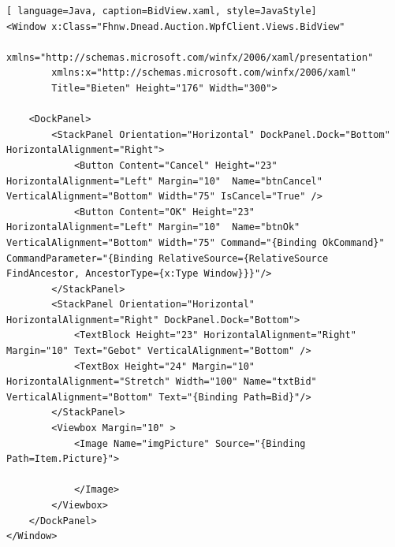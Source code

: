 \documentclass[10pt]{article}
\begin{document}
\begin{lstlisting}[ language=Java, caption=BidView.xaml, style=JavaStyle]
<Window x:Class="Fhnw.Dnead.Auction.WpfClient.Views.BidView"
        xmlns="http://schemas.microsoft.com/winfx/2006/xaml/presentation"
        xmlns:x="http://schemas.microsoft.com/winfx/2006/xaml"
        Title="Bieten" Height="176" Width="300">
   
    <DockPanel>
        <StackPanel Orientation="Horizontal" DockPanel.Dock="Bottom" HorizontalAlignment="Right">
            <Button Content="Cancel" Height="23" HorizontalAlignment="Left" Margin="10"  Name="btnCancel" VerticalAlignment="Bottom" Width="75" IsCancel="True" />
            <Button Content="OK" Height="23" HorizontalAlignment="Left" Margin="10"  Name="btnOk" VerticalAlignment="Bottom" Width="75" Command="{Binding OkCommand}" CommandParameter="{Binding RelativeSource={RelativeSource FindAncestor, AncestorType={x:Type Window}}}"/>
        </StackPanel>
        <StackPanel Orientation="Horizontal" HorizontalAlignment="Right" DockPanel.Dock="Bottom">
            <TextBlock Height="23" HorizontalAlignment="Right" Margin="10" Text="Gebot" VerticalAlignment="Bottom" />
            <TextBox Height="24" Margin="10" HorizontalAlignment="Stretch" Width="100" Name="txtBid" VerticalAlignment="Bottom" Text="{Binding Path=Bid}"/>
        </StackPanel>
        <Viewbox Margin="10" >
            <Image Name="imgPicture" Source="{Binding Path=Item.Picture}">

            </Image>
        </Viewbox>
    </DockPanel>
</Window>
\end{lstlisting}

\end{document}
